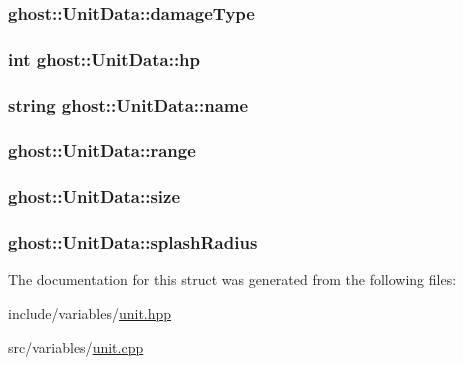 \hypertarget{structghost_1_1UnitData_a635abb95369c4a1d1df106728d94e990}{
\subsubsection[{damage\-Type}]{ ghost\-::\-Unit\-Data\-::damage\-Type}}\label{structghost_1_1UnitData_a635abb95369c4a1d1df106728d94e990}
\hypertarget{structghost_1_1UnitData_ab7e487e0851177e64723ba716d19e485}{
\subsubsection[{hp}]{\setlength{\rightskip}{0pt plus 5cm}int ghost\-::\-Unit\-Data\-::hp}}\label{structghost_1_1UnitData_ab7e487e0851177e64723ba716d19e485}
\hypertarget{structghost_1_1UnitData_a7ecbf48c9ed603fa864f275933b27b70}{
\subsubsection[{name}]{\setlength{\rightskip}{0pt plus 5cm}string ghost\-::\-Unit\-Data\-::name}}\label{structghost_1_1UnitData_a7ecbf48c9ed603fa864f275933b27b70}
\hypertarget{structghost_1_1UnitData_a7951e942e15feab3c1854f869f7f5820}{
\subsubsection[{range}]{ ghost\-::\-Unit\-Data\-::range}}\label{structghost_1_1UnitData_a7951e942e15feab3c1854f869f7f5820}
\hypertarget{structghost_1_1UnitData_a36a08d9f1d0d9bd56e5595492b33a734}{
\subsubsection[{size}]{ ghost\-::\-Unit\-Data\-::size}}\label{structghost_1_1UnitData_a36a08d9f1d0d9bd56e5595492b33a734}
\hypertarget{structghost_1_1UnitData_affa93d0c36e7a68193572acefb3fe4f3}{
\subsubsection[{splash\-Radius}]{ ghost\-::\-Unit\-Data\-::splash\-Radius}}\label{structghost_1_1UnitData_affa93d0c36e7a68193572acefb3fe4f3}


The documentation for this struct was generated from the following files\-:\begin{DoxyCompactItemize}
\item 
include/variables/\hyperlink{unit_8hpp}{unit.\-hpp}\item 
src/variables/\hyperlink{unit_8cpp}{unit.\-cpp}\end{DoxyCompactItemize}
